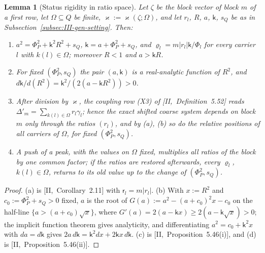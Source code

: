 \documentclass[10pt]{amsart}
\newtheorem{lemma}[theorem]{Lemma}
\theoremstyle{definition}
\theoremstyle{remark}
\begin{document}
\begin{lemma}[Status rigidity in ratio space]\label{lem:III-Rkt}
Let $\zeta$ be the block vector of block $m$ of a first row, let
$\Omega\subseteq Q$ be finite, $\varkappa:=\varkappa(\zeta;\Omega)$, and let
$r_l$, $R$, $a$, $\mathsf k$, $s_Q$ be as in
Subsection~\textup{\ref{subsec:III-gen-setting}}.  Then:
\begin{enumerate}
\item[(a)] $a^2=\Phi_P^2+\mathsf k^2R^2+s_Q$, $\mathsf k=a+\Phi_P^2+s_Q$, and
$\varrho_l=m|r_l|\mathsf k/\Phi_l$ for every carrier $l$ with $k(l)\in\Omega$;
moreover $R<1$ and $a>\mathsf kR$.
\item[(b)] For fixed $(\Phi_P^2,s_Q)$ the pair $(a,\mathsf k)$ is a
real-analytic function of $R^2$, and $d\mathsf k/d(R^2)=\mathsf k^2/
(2(a-\mathsf kR^2))>0$.
\item[(c)] After division by $\varkappa$, the coupling row \textup{(X3)} of
[II,~Definition~5.52] reads $\Delta'_m=\sum_{k(l)\in\Omega}r_l\gamma_l$; hence
the exact shifted coarse system depends on block $m$ only through the
ratios $(r_l)$, and by \textup{(a)}, \textup{(b)} so do the relative
positions of all carriers of $\Omega$, for fixed $(\Phi_P^2,s_Q)$.
\item[(d)] A push of a peak, with the values on $\Omega$ fixed, multiplies
all ratios of the block by one common factor; if the ratios are restored
afterwards, every $\varrho_l$, $k(l)\in\Omega$, returns to its old value up
to the change of $(\Phi_P^2,s_Q)$.
\end{enumerate}
\end{lemma}

\begin{proof}
(a) is [II,~Corollary~2.11] with $\mathsf r_l=m|r_l|$.  (b) With $x:=R^2$ and
$c_0:=\Phi_P^2+s_Q>0$ fixed, $a$ is the root of $G(a):=a^2-(a+c_0)^2x-c_0$ on
the half-line $\{a>(a+c_0)\sqrt x\}$, where $G'(a)=2(a-\mathsf kx)\ge
2(a-\mathsf k\sqrt x)>0$; the implicit function theorem gives analyticity,
and differentiating $a^2=c_0+\mathsf k^2x$ with $da=d\mathsf k$ gives
$2a\,d\mathsf k=\mathsf k^2dx+2\mathsf kx\,d\mathsf k$.  (c) is
[II,~Proposition~5.46(i)], and (d) is [II,~Proposition~5.46(ii)].
\end{proof}
\end{document}
